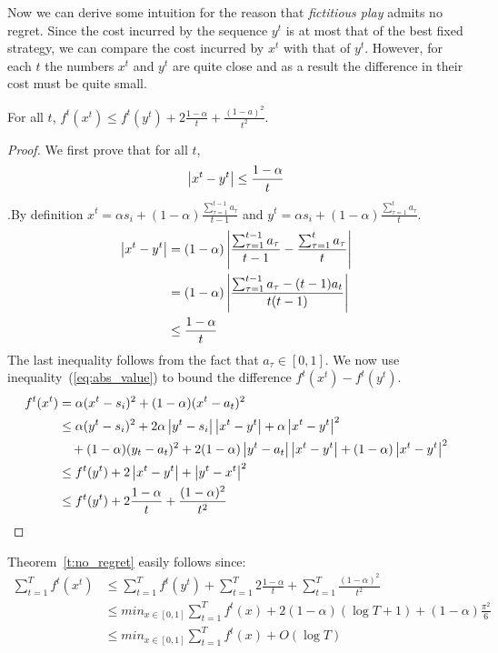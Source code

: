 Now we can derive some intuition for the reason that \emph{fictitious play} admits
no regret. Since the cost incurred by the sequence $y^t$ is at most that of the best
fixed strategy, we can compare the cost incurred by $x^t$ with that of $y^t$.
However, for each $t$ the numbers $x^t$ and $y^t$ are quite close and as a result
the difference in their cost must be quite small.

\begin{lemma}
  For all $t$, $f^t(x^t) \leq f^t(y^t) + 2\frac{1-\alpha}{t} + \frac{(1-a)^2}{t^2}$.
\end{lemma}
\begin{proof}
  We first prove that for all $t$,
  \begin{equation}\label{eq:abs_value}
  	\left|x^t - y^t \right| \leq \frac{1-\alpha}{t}
  \end{equation}
  .By definition $x^t = \alpha s_i + (1-\alpha)\frac{\sum_{\tau = 1}^{t-1} a_\tau}{t-1}$
  and $ y^t = \alpha s_i + (1-\alpha)\frac{\sum_{\tau = 1}^t a_\tau}{t}$.
  \begin{align*}
    \left|x^t - y^t\right|
    &=
    (1-\alpha)\left|\frac{\sum_{\tau = 1}^{t-1}a_\tau}{t-1}
    - \frac{\sum_{\tau = 1}^t a_\tau}{t}\right|\\
    &=
    (1-\alpha)\left|\frac{\sum_{\tau = 1}^{t-1}a_\tau -(t-1)a_t}{t(t-1)}\right|\\
    &\leq
    \frac{1-\alpha}{t}
  \end{align*}
  The last inequality follows from the fact that $a_\tau \in [0,1]$.
  We now use inequality~(\ref{eq:abs_value}) to bound the difference $f^t(x^t) - f^t(y^t)$.
  \begin{align*}
    f^t(x^t)
    &=
    \alpha(x^t - s_i)^2 + (1 - \alpha)(x^t - a_t)^2 \\
    &\leq
    \alpha(y^t - s_i)^2 + 2\alpha\left|y^t -
    s_i\right|\left|x^t - y^t\right| + \alpha \left|x^t - y^t\right|^2 \\
    &\quad + (1-\alpha)(y_t - a_t)^2 +
    2(1-\alpha)\left|y^t - a_t\right|\left|x^t-y^t\right| + (1 - \alpha)\left|x^t - y^t\right|^2\\
    &\leq
    f^t(y^t) + 2\left|x^t - y^t\right| + \left|y^t - x^t\right|^2\\
    &\leq
    f^t(y^t) + 2\frac{1-\alpha}{t} + \frac{(1-\alpha)^2}{t^2}
  \end{align*}
\end{proof}





Theorem~\ref{t:no_regret} easily follows since:
\begin{align*}
  \sum_{t=1}^T f^t(x^t)
  &\leq
  \sum_{t=1}^T f^t(y^t) + \sum_{t=1}^T 2\frac{1-\alpha}{t} +
  \sum_{t=1}^T \frac{(1-\alpha)^2}{t^2}\\
  &\leq
  min_{x \in [0,1]} \sum_{t=1}^T f^t(x) +
  2(1-\alpha)(\log T + 1) + (1-\alpha)\frac{\pi^2}{6}\\
  &\leq
  min_{x \in [0,1]} \sum_{t=1}^T f^t(x) + O(\log T)
\end{align*}
